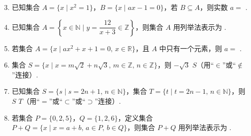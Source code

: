 \documentclass[a4paper,11pt]{article}
\begin{document}


\begin{enumerate}
\setcounter{enumi}{2}
\item 已知集合 $A=\{x \mid x^2=1\}$，$B=\{x \mid ax-1=0\}$，若 $B \subseteq A$，则实数 $a=$ \blankline[2.5em].


\item 已知集合 $A=\left\{x \in \mathbb{N} \mid y=\dfrac{12}{x+3}\in\mathbb{Z}\right\}$，则集合 $A$ 用列举法表示为 \blankline[2em].


\item 若集合 $A=\{x \mid ax^2+x+1=0,\, x\in\mathbb{R}\}$，且 $A$ 中只有一个元素，则 $a=$ \blankline[2em].

\item 集合 $S=\{x \mid x=m\sqrt{2}+n\sqrt{3},\, m\in\mathbb{Z},\, n\in\mathbb{Z}\}$，则 $-\sqrt{3}$ \blankline[1.2em] $S$（用“$\in$”或“$\notin$”连接）.

\ans{$\in$}

\item 已知集合 $S=\{s \mid s=2n+1,\, n\in\mathbb{N}\}$，集合 $T=\{t \mid t=2n-1,\, n\in\mathbb{N}\}$，则 $S$ \blankline[1.2em] $T$（用“$=$”或“$\subset$”或“$\supset$”连接）.

\ans{$\subset$}

\item 若集合 $P=\{0,2,5\}$，$Q=\{1,2,6\}$，定义集合 $P+Q=\{x \mid x=a+b,\, a\in P,\, b\in Q\}$，则集合 $P+Q$ 用列举法表示为 \blankline[2em].


\end{enumerate}
\end{document}
